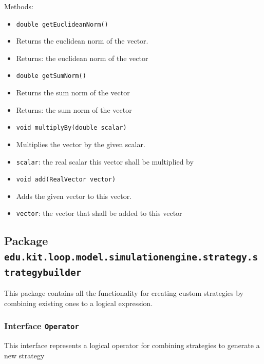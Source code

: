 \documentclass[parskip=full,11pt]{scrartcl}
\begin{document}
Methods:
\begin{itemize}\itemsep -10pt
\item \texttt{double getEuclideanNorm()}
\item[] Returns the euclidean norm of the vector.
\item[] Returns: the euclidean norm of the vector

\item \texttt{double getSumNorm()}
\item[] Returns the sum norm of the vector
\item[] Returns: the sum norm of the vector

\item \texttt{void multiplyBy(double scalar)}
\item[] Multiplies the vector by the given scalar.
\item[] \texttt{scalar}: the real scalar this vector shall be multiplied by

\item \texttt{void add(RealVector vector)}
\item[] Adds the given vector to this vector.
\item[] \texttt{vector}: the vector that shall be added to this vector
\end{itemize}

\subsection{Package \texttt{edu.kit.loop.model.simulationengine.strategy.strategybuilder}}

This package contains all the functionality for creating custom strategies by combining existing ones to a logical expression.

\subsubsection{Interface \texttt{Operator}}

This interface represents a logical operator for combining strategies to generate a new strategy
\end{document}
